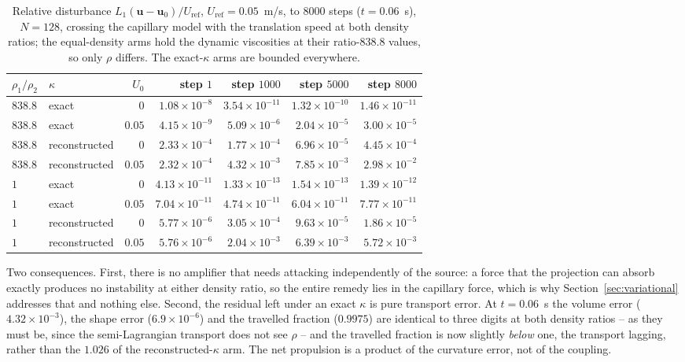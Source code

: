 \documentclass[preprint,3p,11pt]{elsarticle}
\newcommand{\uvec}{\mathbf{u}}
\begin{document}
\begin{table}[t]
  \centering
  \caption{Relative disturbance $L_1(\uvec-\uvec_0)/U_{\mathrm{ref}}$,
  $U_{\mathrm{ref}}=0.05$~m/s, to $8000$ steps ($t=0.06$~s), $N=128$,
  crossing the capillary model with the translation speed at both density ratios; the
  equal-density arms hold the dynamic viscosities at their ratio-$838.8$ values, so only
  $\rho$ differs. The exact-$\kappa$ arms are bounded everywhere.}
  \label{tab:amplifier}
  \begin{tabular}{l l r r r r r}
    \hline
    $\rho_1/\rho_2$ & $\kappa$ & $U_0$ & step $1$ & step $1000$ & step $5000$ & step $8000$ \\
    \hline
    $838.8$ & exact         & $0$    & $1.08\times10^{-8}$  & $3.54\times10^{-11}$ & $1.32\times10^{-10}$ & $1.46\times10^{-11}$ \\
    $838.8$ & exact         & $0.05$ & $4.15\times10^{-9}$  & $5.09\times10^{-6}$  & $2.04\times10^{-5}$  & $3.00\times10^{-5}$ \\
    $838.8$ & reconstructed & $0$    & $2.33\times10^{-4}$  & $1.77\times10^{-4}$  & $6.96\times10^{-5}$  & $4.45\times10^{-4}$ \\
    $838.8$ & reconstructed & $0.05$ & $2.32\times10^{-4}$  & $4.32\times10^{-3}$  & $7.85\times10^{-3}$  & $2.98\times10^{-2}$ \\
    \hline
    $1$ & exact         & $0$    & $4.13\times10^{-11}$ & $1.33\times10^{-13}$ & $1.54\times10^{-13}$ & $1.39\times10^{-12}$ \\
    $1$ & exact         & $0.05$ & $7.04\times10^{-11}$ & $4.74\times10^{-11}$ & $6.04\times10^{-11}$ & $7.77\times10^{-11}$ \\
    $1$ & reconstructed & $0$    & $5.77\times10^{-6}$  & $3.05\times10^{-4}$  & $9.63\times10^{-5}$  & $1.86\times10^{-5}$ \\
    $1$ & reconstructed & $0.05$ & $5.76\times10^{-6}$  & $2.04\times10^{-3}$  & $6.39\times10^{-3}$  & $5.72\times10^{-3}$ \\
    \hline
  \end{tabular}
\end{table}

Two consequences. First, there is no amplifier that needs attacking independently of the
source: a force that the projection can absorb exactly produces no instability at either
density ratio, so the entire remedy lies in the capillary force, which is why
Section~\ref{sec:variational} addresses that and nothing else. Second, the residual left
under an exact $\kappa$ is pure transport error. At $t=0.06$~s the volume error
($4.32\times10^{-3}$), the shape error ($6.9\times10^{-6}$) and the travelled fraction
($0.9975$) are identical to three digits at both density ratios -- as they must be, since
the semi-Lagrangian transport does not see $\rho$ -- and the travelled fraction is now
slightly \emph{below} one, the transport lagging, rather than the $1.026$ of the
reconstructed-$\kappa$ arm. The net propulsion is a product of the curvature error, not of
the coupling.
\end{document}
